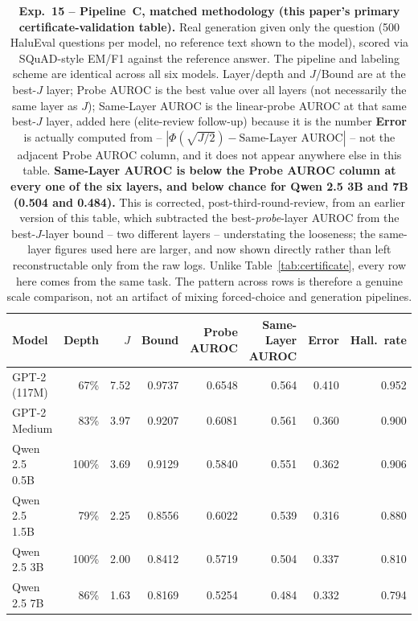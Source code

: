 \documentclass[onecolumn]{jmlr}
\begin{document}
\begin{table}[!htbp]
\centering
\caption{\textbf{Exp.~15 -- Pipeline~C, matched methodology (this
  paper's primary certificate-validation table).} Real generation given
  only the question (500 HaluEval questions per model, no reference
  text shown to the model), scored via SQuAD-style EM/F1 against the
  reference answer. The pipeline and labeling scheme are identical
  across all six models. Layer/depth and $J$/Bound are at the best-$J$
  layer; Probe AUROC is the best value over all layers (not necessarily
  the same layer as $J$); Same-Layer AUROC is the linear-probe AUROC at
  that same best-$J$ layer, added here (elite-review follow-up) because
  it is the number \textbf{Error} is actually computed from --
  $|\Phi(\sqrt{J/2})-\text{Same-Layer AUROC}|$ -- not the adjacent
  Probe AUROC column, and it does not appear anywhere else in this
  table. \textbf{Same-Layer AUROC is below the Probe AUROC column at
  every one of the six layers, and below chance for Qwen 2.5 3B and
  7B (0.504 and 0.484).} This is corrected, post-third-round-review,
  from an earlier version of this table, which subtracted the
  best-\emph{probe}-layer AUROC from the best-$J$-layer bound -- two
  different layers -- understating the looseness; the same-layer
  figures used here are larger, and now shown directly rather than left
  reconstructable only from the raw logs. Unlike
  Table~\ref{tab:certificate}, every row here comes from the same task.
  The pattern across rows is therefore a genuine scale comparison, not
  an artifact of mixing forced-choice and generation pipelines.}
\label{tab:certificate-matched}
\small
\setlength{\tabcolsep}{3pt}
\begin{tabular}{lrrrrrrr}
\toprule
\textbf{Model} & \textbf{Depth} & $J$ & \textbf{Bound} & \textbf{Probe AUROC} & \textbf{Same-Layer AUROC} & \textbf{Error} & \textbf{Hall.\ rate} \\
\midrule
GPT-2 (117M)   & 67\% & 7.52 & 0.9737 & 0.6548 & 0.564 & 0.410 & 0.952 \\
GPT-2 Medium   & 83\% & 3.97 & 0.9207 & 0.6081 & 0.561 & 0.360 & 0.900 \\
Qwen 2.5 0.5B  & 100\% & 3.69 & 0.9129 & 0.5840 & 0.551 & 0.362 & 0.906 \\
Qwen 2.5 1.5B  & 79\% & 2.25 & 0.8556 & 0.6022 & 0.539 & 0.316 & 0.880 \\
Qwen 2.5 3B    & 100\% & 2.00 & 0.8412 & 0.5719 & 0.504 & 0.337 & 0.810 \\
Qwen 2.5 7B    & 86\% & 1.63 & 0.8169 & 0.5254 & 0.484 & 0.332 & 0.794 \\
\bottomrule
\end{tabular}
\end{table}
\end{document}

